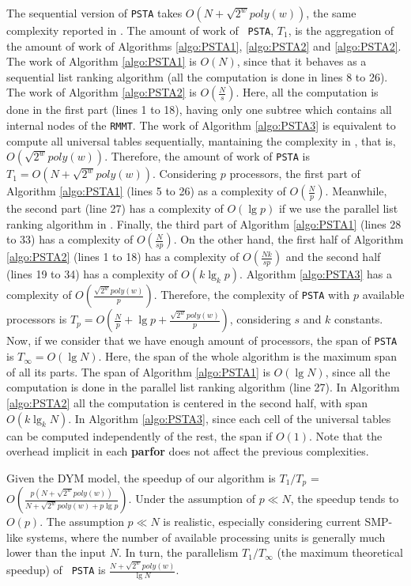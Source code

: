 The sequential version of {\tt PSTA} takes $O(N+\sqrt{2^{w}}poly(w))$,
the same complexity reported in
\cite{Navarro:2014:FFS:2620785.2601073}. The amount of work of {\tt
PSTA}, $T_1$, is the aggregation of the amount of work of Algorithms
\ref{algo:PSTA1}, \ref{algo:PSTA2} and \ref{algo:PSTA2}. The work of
Algorithm \ref{algo:PSTA1} is $O(N)$, since that it behaves as a
sequential list ranking algorithm (all the computation is done in
lines 8 to 26). The work of Algorithm \ref{algo:PSTA2} is
$O(\frac{N}{s})$. Here, all the computation is done in the first part
(lines 1 to 18), having only one subtree which contains all internal
nodes of the {\tt RMMT}. The work of Algorithm \ref{algo:PSTA3} is
equivalent to compute all universal tables sequentially, mantaining
the complexity in \cite{Navarro:2014:FFS:2620785.2601073}, that is,
$O(\sqrt{2^{w}}poly(w))$. Therefore, the amount of work of {\tt PSTA}
is $T_{1}=O(N+\sqrt{2^{w}}poly(w))$. Considering $p$ processors, the
first part of Algorithm \ref{algo:PSTA1} (lines 5 to 26) as a
complexity of $O(\frac{N}{p})$. Meanwhile, the second part (line 27)
has a complexity of $O(\lg p)$ if we use the parallel list ranking
algorithm in \cite{Reif1993}. Finally, the third part of Algorithm
\ref{algo:PSTA1} (lines 28 to 33) has a complexity of
$O(\frac{N}{sp})$. On the other hand, the first half of Algorithm
\ref{algo:PSTA2} (lines 1 to 18) has a complexity of
$O(\frac{Nk}{sp})$ and the second half (lines 19 to 34) has a
complexity of $O(k\lg_{k}p)$. Algorithm \ref{algo:PSTA3} has a
complexity of $O(\frac{\sqrt{2^{w}}poly(w)}{p})$. Therefore, the
complexity of {\tt PSTA} with $p$ available processors is $T_p =
O(\frac{N}{p}+\lg p+\frac{\sqrt{2^{w}}poly(w)}{p})$, considering $s$
and $k$ constants. Now, if we consider that we have enough amount of
processors, the span of {\tt PSTA} is $T_{\infty}=O(\lg N)$. Here, the
span of the whole algorithm is the maximum span of all its parts. The
span of Algorithm \ref{algo:PSTA1} is $O(\lg N)$, since all the
computation is done in the parallel list ranking algorithm (line
27). In Algorithm \ref{algo:PSTA2} all the computation is centered in
the second half, with span $O(k\lg_{k}N)$. In Algorithm
\ref{algo:PSTA3}, since each cell of the universal tables can be
computed independently of the rest, the span if $O(1)$. Note that the
overhead implicit in each {\bf parfor} does not affect the previous
complexities.

Given the DYM model, the speedup of our algorithm is $T_1/T_p$ =
$O(\frac{p(N+\sqrt{2^{w}}poly(w))}{N+\sqrt{2^{w}}poly(w)+p\lg
p})$. Under the assumption of $p\ll N$, the speedup tends to
$O(p)$. The assumption $p\ll N$ is realistic, especially considering
current SMP-like systems, where the number of available processing
units is generally much lower than the input $N$. In turn, the
parallelism $T_1/T_{\infty}$ (the maximum theoretical speedup) of {\tt
PSTA} is $\frac{N+\sqrt{2^{w}}poly(w)}{\lg N}$.

